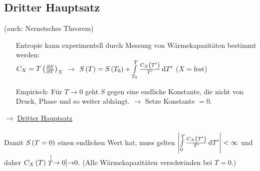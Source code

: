 \subsection{Dritter Hauptsatz}
(auch: Nernstsches Theorem)
\begin{itemize}[align=left]
  \item[Entropie] kann experimentell durch Messung von Wärmekapazitäten bestimmt werden:\\
  $C_X = T\left(\frac{\partial S}{\partial T}\right)_{X}$ $\rightarrow$ $S\left( T \right) = S\left( T_0 \right) + \int\limits_{T_0}^{T} \frac{C_X\left( T' \right)}{T'} \,\text d{T'}$ ($X = \text{fest}$)
  \item[Empirisch:] Für $T\to 0$ geht $S$ gegen eine endliche Konstante, die nicht von Druck, Phase und so weiter abhängt. $\rightarrow$ Setze Konstante $=0$.
\end{itemize}
$\rightarrow$ \uline{Dritter Hauptsatz}\\
\\
Damit $S\left( T=0 \right)$ einen endlichen Wert hat, muss gelten $\left| \int\limits_0^T \frac{C_X\left( T' \right)}{T'}\,\text d{T'} \right| < \infty$ und daher $C_X\left( T \right) \stackrel[T\to 0]{ }{\rightarrow} 0$. (Alle Wärmekapazitäten verschwinden bei $T=0$.)

